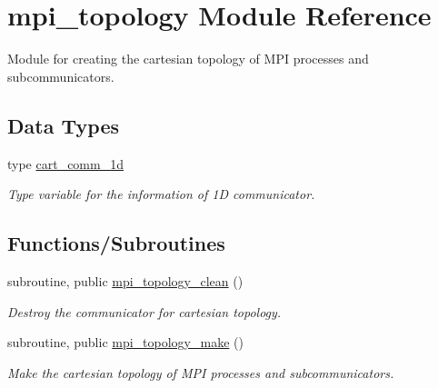\hypertarget{namespacempi__topology}{}\section{mpi\+\_\+topology Module Reference}
\label{namespacempi__topology}


Module for creating the cartesian topology of M\+PI processes and subcommunicators.  


\subsection*{Data Types}
\begin{DoxyCompactItemize}
\item 
type \mbox{\hyperlink{structmpi__topology_1_1cart__comm__1d}{cart\+\_\+comm\+\_\+1d}}
\begin{DoxyCompactList}\small\item\em Type variable for the information of 1D communicator. \end{DoxyCompactList}\end{DoxyCompactItemize}
\subsection*{Functions/\+Subroutines}
\begin{DoxyCompactItemize}
\item 
subroutine, public \mbox{\hyperlink{namespacempi__topology_aa14e91baaec6d1c1082ebd5ac6e19128}{mpi\+\_\+topology\+\_\+clean}} ()
\begin{DoxyCompactList}\small\item\em Destroy the communicator for cartesian topology. \end{DoxyCompactList}\item 
subroutine, public \mbox{\hyperlink{namespacempi__topology_a8819f16f50aded913f17520a29d3ec4c}{mpi\+\_\+topology\+\_\+make}} ()
\begin{DoxyCompactList}\small\item\em Make the cartesian topology of M\+PI processes and subcommunicators. \end{DoxyCompactList}\end{DoxyCompactItemize}
